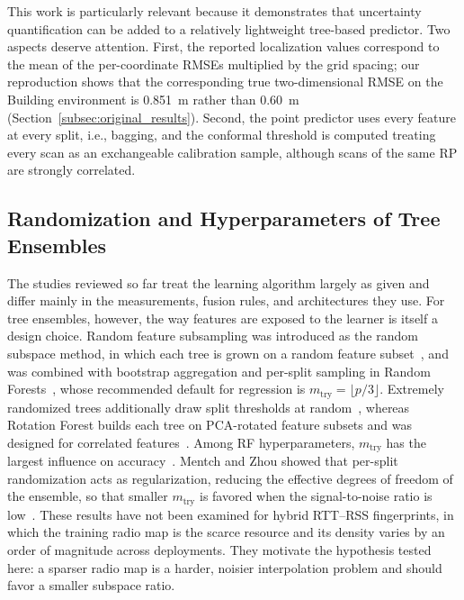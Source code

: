 This work is particularly relevant because it demonstrates that uncertainty quantification can be added to a relatively lightweight tree-based predictor. Two aspects deserve attention. First, the reported localization values correspond to the mean of the per-coordinate RMSEs multiplied by the grid spacing; our reproduction shows that the corresponding true two-dimensional RMSE on the Building environment is 0.851~m rather than 0.60~m (Section~\ref{subsec:original_results}). Second, the point predictor uses every feature at every split, i.e., bagging, and the conformal threshold is computed treating every scan as an exchangeable calibration sample, although scans of the same RP are strongly correlated.

\subsection{Randomization and Hyperparameters of Tree Ensembles}
\label{subsec:rw_ensembles}

The studies reviewed so far treat the learning algorithm largely as given and differ mainly in the measurements, fusion rules, and architectures they use. For tree ensembles, however, the way features are exposed to the learner is itself a design choice. Random feature subsampling was introduced as the random subspace method, in which each tree is grown on a random feature subset~\cite{ho1998random}, and was combined with bootstrap aggregation and per-split sampling in Random Forests~\cite{breiman2001random}, whose recommended default for regression is $m_{\mathrm{try}}=\lfloor p/3\rfloor$. Extremely randomized trees additionally draw split thresholds at random~\cite{geurts2006extremely}, whereas Rotation Forest builds each tree on PCA-rotated feature subsets and was designed for correlated features~\cite{rodriguez2006rotation}. Among RF hyperparameters, $m_{\mathrm{try}}$ has the largest influence on accuracy~\cite{probst2019hyperparameters}. Mentch and Zhou showed that per-split randomization acts as regularization, reducing the effective degrees of freedom of the ensemble, so that smaller $m_{\mathrm{try}}$ is favored when the signal-to-noise ratio is low~\cite{mentch2020randomization}. These results have not been examined for hybrid RTT--RSS fingerprints, in which the training radio map is the scarce resource and its density varies by an order of magnitude across deployments. They motivate the hypothesis tested here: a sparser radio map is a harder, noisier interpolation problem and should favor a smaller subspace ratio.

